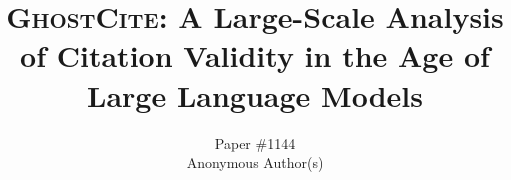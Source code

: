 \documentclass[letterpaper,twocolumn,10pt]{article}
\begin{document}

\date{}


\title{\textsc{GhostCite}: A Large-Scale Analysis of Citation Validity in the Age of\\Large Language Models}


\author{Paper \#1144\\Anonymous Author(s)}


\maketitle

\begin{abstract}

\end{abstract}











\newpage








\balance
\newpage
\appendix


\end{document}
